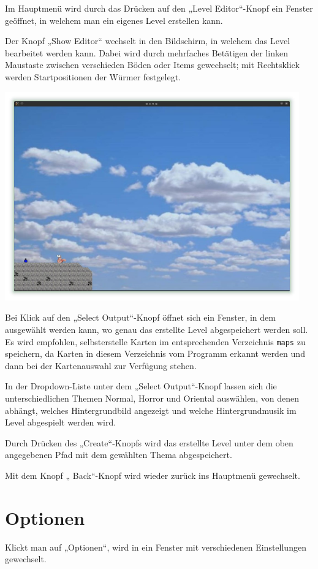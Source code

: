 \documentclass{scrreprt}
\begin{document}
Im Hauptmenü wird durch das Drücken auf den „Level Editor“-Knopf ein Fenster geöffnet, in welchem man ein eigenes Level erstellen kann.

Der Knopf „Show Editor“ wechselt in den Bildschirm, in welchem das Level bearbeitet werden kann. Dabei wird durch mehrfaches Betätigen der linken
Maustaste zwischen verschieden Böden oder Items gewechselt; mit Rechtsklick werden Startpositionen der Würmer festgelegt.

\includegraphics[height=9cm]{Screenshot4.jpg}

Bei Klick auf den „Select Output“-Knopf öffnet sich ein Fenster, in dem ausgewählt werden kann, wo genau das erstellte Level abgespeichert werden soll. Es wird empfohlen, selbsterstelle Karten im entsprechenden Verzeichnis \texttt{maps} zu speichern, da Karten in diesem Verzeichnis vom Programm erkannt werden und dann bei der Kartenauswahl zur Verfügung stehen.

In der Dropdown-Liste unter dem „Select Output“-Knopf lassen sich die unterschiedlichen Themen Normal, Horror und Oriental auswählen, von denen abhängt, welches Hintergrundbild angezeigt und welche Hintergrundmusik im Level abgespielt werden wird.

Durch Drücken des „Create“-Knopfs wird das erstellte Level unter dem oben angegebenen Pfad mit dem gewählten Thema abgespeichert.

Mit dem Knopf „ Back“-Knopf wird wieder zurück ins Hauptmenü gewechselt.

\chapter{Optionen}
Klickt man auf „Optionen“, wird in ein Fenster mit verschiedenen Einstellungen gewechselt.
\end{document}
